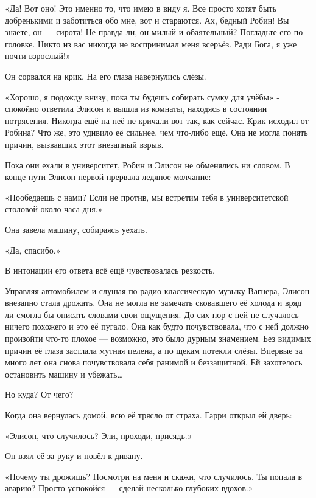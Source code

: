 \documentclass[a4paper,12pt]{book}
\begin{document}
«Да! Вот оно! Это именно то, что имею в виду я. Все просто хотят быть добренькими и заботиться обо мне, вот и стараются. Ах, бедный Робин! Вы знаете, он — сирота! Не правда ли, он милый и обаятельный? Погладьте его по головке. Никто из вас никогда не воспринимал меня всерьёз. Ради Бога, я уже почти взрослый!»
\par
Он сорвался на крик. На его глаза навернулись слёзы.\\
\par
«Хорошо, я подожду внизу, пока ты будешь собирать сумку для учёбы» - спокойно ответила Элисон и вышла из комнаты, находясь в состоянии потрясения. Никогда ещё на неё не кричали вот так, как сейчас. Крик исходил от Робина? Что же, это удивило её сильнее, чем что-либо ещё. Она не могла понять причин, вызвавших этот внезапный взрыв.\\
\par
Пока они ехали в университет, Робин и Элисон не обменялись ни словом. В конце пути Элисон первой прервала ледяное молчание:
\par
«Пообедаешь с нами? Если не против, мы встретим тебя в университетской столовой около часа дня.»
\par
Она завела машину, собираясь уехать.
\par
«Да, спасибо.»
\par
В интонации его ответа всё ещё чувствовалась резкость.\\
\par
Управляя автомобилем и слушая по радио классическую музыку Вагнера, Элисон внезапно стала дрожать. Она не могла не замечать сковавшего её холода и вряд ли смогла бы описать словами свои ощущения. До сих пор с ней не случалось ничего похожего и это её пугало. Она как будто почувствовала, что с ней должно произойти что-то плохое — возможно, это было дурным знамением. Без видимых причин её глаза застлала мутная пелена, а по щекам потекли слёзы. Впервые за много лет она снова почувствовала себя ранимой и беззащитной. Ей захотелось остановить машину и убежать…
\par
Но куда? От чего?\\
\par
Когда она вернулась домой, всю её трясло от страха. Гарри открыл ей дверь:
\par
«Элисон, что случилось? Эли, проходи, присядь.»
\par
Он взял её за руку и повёл к дивану.
\par
«Почему ты дрожишь? Посмотри на меня и скажи, что случилось. Ты попала в аварию? Просто успокойся — сделай несколько глубоких вдохов.»
\end{document}
